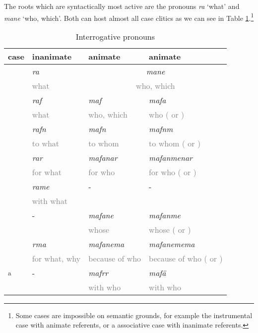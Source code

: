 The roots which are syntactically most active are the  pronouns \emph{ra} `what' and \emph{mane} `who, which'. Both can host almost all case clitics as we can see in Table \ref{interrog}.\footnote{Some cases are impossible on semantic grounds, for example the instrumental case with animate referents, or a associative case with inanimate referents.}

\begin{table}
\caption{Interrogative pronouns}
\label{interrog}
	\begin{tabularx}{\textwidth}{XXXX}
		\lsptoprule
		{case} & {inanimate} & {animate} \Sg & {animate} \Nsg\\
		\hline
		\Abs & \emph{ra}&\multicolumn{2}{|c|}{\emph{mane}}\\
		&\textcolor{gray}{\footnotesize what} &\multicolumn{2}{|c|}{\textcolor{gray}{\footnotesize who, which}}\\\cline{3-4}
		\Erg{} &\emph{raf}&\emph{maf} &\emph{mafa}\\
		& \textcolor{gray}{\footnotesize what} &\textcolor{gray}{\footnotesize who, which} &\textcolor{gray}{\footnotesize who (\Du{} or \Pl{})}\\
		\Dat &\emph{rafn}&\emph{mafn} &\emph{mafnm}\\
		&\textcolor{gray}{\footnotesize to what} &\textcolor{gray}{\footnotesize to whom} &\textcolor{gray}{\footnotesize to whom (\Du{} or \Pl{})}\\
		\Purp &\emph{rar}&\emph{mafanar} &\emph{mafanmenar}\\
		&\textcolor{gray}{\footnotesize for what} &\textcolor{gray}{\footnotesize for who} &\textcolor{gray}{\footnotesize for who (\Du{} or \Pl{})}\\
		\Ins &\emph{rame}&-&-\\
		&\textcolor{gray}{\footnotesize with what}&&\\
		\Poss &- &\emph{mafane} &\emph{mafanme}\\
		& &\textcolor{gray}{\footnotesize whose} &\textcolor{gray}{\footnotesize whose (\Du{} or \Pl{})}\\
		\Char &\emph{rma} &\emph{mafanema} &\emph{mafanemema}\\
		&\textcolor{gray}{\footnotesize for what, why}&\textcolor{gray}{\footnotesize because of who}&\textcolor{gray}{\footnotesize because of who (\Du{} or \Pl{})}\\
		\Assoc\textsuperscript{a} &- &\emph{mafrr} &\emph{mafä}\\
		& &\textcolor{gray}{\footnotesize with who} &\textcolor{gray}{\footnotesize with who}\\

\end{tabularx}
\end{table}

